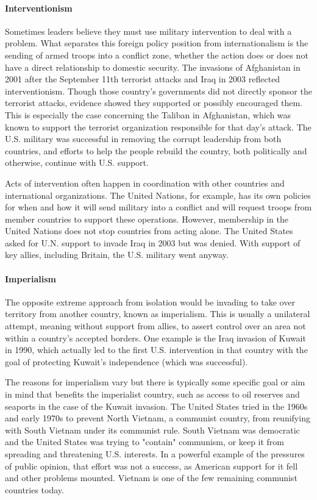 \paragraph{Interventionism} Sometimes leaders believe they must use military
intervention to deal with a problem. What separates this foreign policy position
from internationalism is the sending of armed troops into a conflict zone,
whether the action does or does not have a direct relationship to domestic
security. The invasions of Afghanistan in 2001 after the September 11th
terrorist attacks and Iraq in 2003 reflected interventionism. Though those
country's governments did not directly sponsor the terrorist attacks, evidence
showed they supported or possibly encouraged them. This is especially the case
concerning the Taliban in Afghanistan, which was known to support the terrorist
organization responsible for that day's attack. The U.S. military was successful
in removing the corrupt leadership from both countries, and efforts to help the
people rebuild the country, both politically and otherwise, continue with U.S.
support.

Acts of intervention often happen in coordination with other countries and
international organizations. The United Nations, for example, has its own
policies for when and how it will send military into a conflict and will request
troops from member countries to support these operations. However, membership in
the United Nations does not stop countries from acting alone. The United States
asked for U.N. support to invade Iraq in 2003 but was denied. With support of
key allies, including Britain, the U.S. military went anyway.

\paragraph{Imperialism} The opposite extreme approach from isolation would be
invading to take over territory from another country, known as imperialism. This
is usually a unilateral attempt, meaning without support from allies, to assert
control over an area not within a country's accepted borders. One example is the
Iraq invasion of Kuwait in 1990, which actually led to the first U.S.
intervention in that country with the goal of protecting Kuwait's independence
(which was successful).

The reasons for imperialism vary but there is typically some specific goal or
aim in mind that benefits the imperialist country, such as access to oil
reserves and seaports in the case of the Kuwait invasion. The United States
tried in the 1960s and early 1970s to prevent North Vietnam, a communist
country, from reunifying with South Vietnam under its communist rule. South
Vietnam was democratic and the United States was trying to "contain" communism,
or keep it from spreading and threatening U.S. interests. In a powerful example
of the pressures of public opinion, that effort was not a success, as American
support for it fell and other problems mounted. Vietnam is one of the few
remaining communist countries today.

